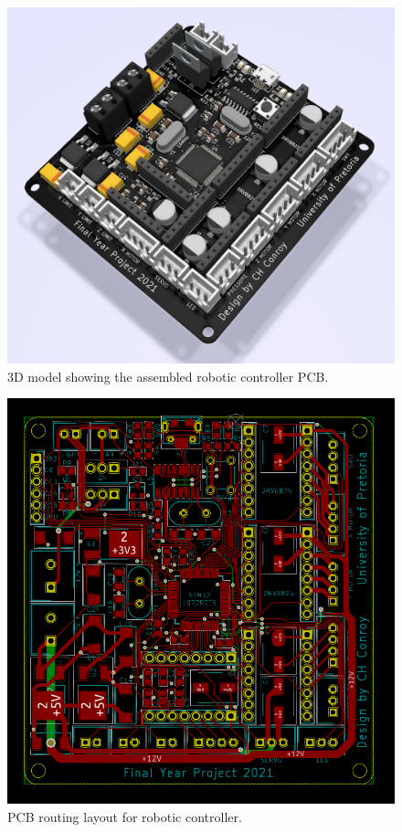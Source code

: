\begin{figure}[H]
	\centering
	\includegraphics[width=0.7\linewidth]{figures/robotic-controller-model.png}
	\caption{3D model showing the assembled robotic controller PCB.}
	\label{fig:robotic-controller-model}
\end{figure}

\begin{figure}[H]
	\centering
	\includegraphics[width=1\linewidth]{figures/pcb-routing.PNG}
	\caption{PCB routing layout for robotic controller.}
	\label{fig:pcb-routing}
\end{figure}

